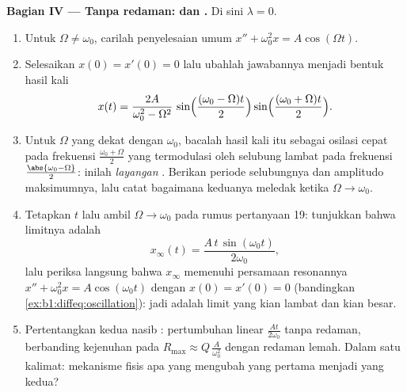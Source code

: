 \begin{problem}
\medskip
\noindent\textbf{Bagian IV --- Tanpa redaman:  dan .}
Di sini $\lambda = 0$.
\begin{enumerate}[resume]
  \item Untuk $\Omega \neq \omega_0$, carilah penyelesaian umum
        $x'' + \omega_0^2 x = A\cos(\Omega t)$.
  \item Selesaikan  $x(0) = x'(0) = 0$ lalu ubahlah
        jawabannya menjadi bentuk hasil kali
        \[
        x(t) = \frac{2A}{\omega_0^2 - \Omega^2}\,
        \sin\Bigl(\frac{(\omega_0 - \Omega)t}2\Bigr)
        \sin\Bigl(\frac{(\omega_0 + \Omega)t}2\Bigr) .
        \]
  \item Untuk $\Omega$ yang dekat dengan $\omega_0$, bacalah hasil kali itu sebagai
        osilasi cepat pada frekuensi $\frac{\omega_0 + \Omega}2$
        yang termodulasi oleh selubung lambat pada frekuensi
        $\frac{\abs{\omega_0 - \Omega}}2$: inilah \emph{layangan}
        . Berikan periode selubungnya dan
        amplitudo maksimumnya, lalu catat bagaimana keduanya meledak ketika $\Omega
        \to \omega_0$.
  \item Tetapkan $t$ lalu ambil $\Omega \to \omega_0$ pada rumus
        pertanyaan 19: tunjukkan bahwa limitnya adalah
        \[
        x_\infty(t) = \frac{A\,t\,\sin(\omega_0 t)}{2\omega_0} ,
        \]
        lalu periksa langsung bahwa $x_\infty$ memenuhi persamaan
        resonannya $x'' + \omega_0^2 x = A\cos(\omega_0 t)$ dengan
        $x(0) = x'(0) = 0$ (bandingkan
        \cref{ex:b1:diffeq:oscillation}): jadi  adalah limit
         yang kian lambat dan kian besar.
  \item Pertentangkan kedua nasib : pertumbuhan linear
        $\frac{At}{2\omega_0}$ tanpa redaman, berbanding kejenuhan
        pada $R_{\max} \approx Q\,\frac{A}{\omega_0^2}$ dengan redaman
        lemah. Dalam satu kalimat: mekanisme fisis apa yang mengubah
        yang pertama menjadi yang kedua?
\end{enumerate}


\end{problem}
